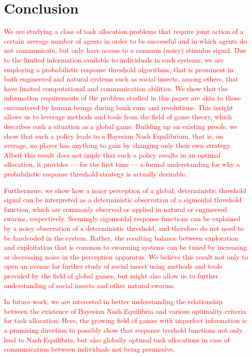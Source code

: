 \documentclass[smallextended]{svjour3}       %
\newcommand{\edit}[1]{\textcolor{red}{#1}}
\begin{document}
\section{Conclusion}
\edit{We are studying a class of task allocation problems that require joint action of a certain average number of agents in order to be successful and in which agents do not communicate, but only have access to a common (noisy) stimulus signal. Due to the limited information available to individuals in such systems, we are employing a probabilistic response threshold algorithms, that is prominent in both engineered and natural systems such as social insects, among others, that have limited computational and communication abilities. We show that the information requirements of the problem studied in this paper are akin to those encountered by human beings during bank runs and revolutions. This insight allows us to leverage methods and tools from the field of game theory, which describes such a situation as a global game. Building up on existing proofs, we show that such a policy leads to a Bayesian Nash Equilibrium, that is, on average, no player has anything to gain by changing only their own strategy. Albeit this result does not imply that such a policy results in an optimal allocation, it provides --- for the first time --- a formal understanding for why a probabilistic response threshold strategy is actually desirable.}  

\edit{Furthermore, we show how a noisy perception of a global, deterministic threshold signal can be interpreted as a deterministic observation of a sigmoidal threshold function, which are commonly observed or applied in natural or engineered swarms, respectively. Seemingly sigomoidal response functions can be explained by a noisy observation of a deterministic threshold, and therefore do not need to be hardcoded in the system. Rather, the resulting balance between exploration and exploitation that is common to swarming systems can be tuned by increasing or decreasing noise in the perception apparatus. We believe this result not only to open an avenue for further study of social insect using methods and tools provided by the field of global games, but might also allow us to further understanding of social insects and other natural swarms.}

\edit{In future work, we are interested in better understanding the relationship between the existence of Bayesian Nash Equilibria and various optimality criteria for task allocation. Here, the growing field of games with imperfect information is a promising direction to possibly show that response treshold functions not only lead to Nash Equilibria, but also globally optimal task allocations in case of communication between individuals not being permissive.}
\end{document}
